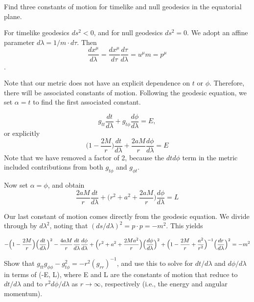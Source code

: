 \documentclass[11pt,largemargins]{homework}
\begin{document}
\begin{alphaparts}
\questionpart
Find three constants of motion for timelike and null geodesics in the equatorial plane. 

For timelike geodesics $ds^2 < 0$, and for null geodesics $ds^2 = 0$.  We adopt an affine parameter $d\lambda = 1/m \cdot d\tau$. Then 
$$\frac{dx^{\mu}}{d\lambda} = \frac{dx^{\mu}}{d\tau} \frac{d\tau}{d\lambda} = u^{\mu}m = p^{\mu}$$.

Note that our metric does not have an explicit dependence on $t$ or $\phi$.  Therefore, there will be associated constants of motion.  Following the geodesic equation, we set $\alpha = t$ to find the first associated constant. 

$$g_{tt} \frac{dt}{d\lambda} + g_{t\phi} \frac{d\phi}{d\lambda} = E,$$ or explicitly
$$\Big(1 - \frac{2M}{r} \Big) \frac{dt}{d\lambda} +  \frac{2aM}{r} \frac{d\phi}{d\lambda} = E$$
Note that we have removed a factor of 2, because the $dtd\phi$ term in the metric included contributions from both $g_{t\phi}$ and $g_{\phi t}$.

Now set $\alpha = \phi$, and obtain
$$\frac{2aM}{r} \frac{dt}{d\lambda} + \Big(r^2 + a^2 + \frac{2aM}{r} \Big) \frac{d\phi}{d\lambda} = L $$

Our last constant of motion comes directly from the geodesic equation.  We divide through by $d\lambda^2$, noting that $(ds/d\lambda)^2 = p \cdot p = -m^2.$  This yields

$$
\centering
- \Big(1 - \frac{2M}{r} \Big) \Big(\frac{dt}{d\lambda}\Big)^2 - \frac{4aM}{r} \frac{dt}{d\lambda} \frac{d\phi}{d\lambda} + \Big(r^2 + a^2 + \frac{2Ma^2}{r} \Big) \Big( \frac{d\phi}{d\lambda} \Big)^2 +  \Big(1 - \frac{2M}{r} + \frac{a^2}{r^2} \Big)^{-1} \Big(\frac{dr}{d\lambda} \Big)^2 = -m^2 $$

\questionpart
Show that $g_{tt} g_{\phi \phi} - g_{t \phi}^2 = -r^2 (g_{rr})^{-1}$, and use this to solve for $dt/d\lambda$ and $d\phi / d\lambda$ in terms of (-E, L), where E and L are the constants of motion that reduce to $dt/d\lambda$ and to $r^2 d\phi / d\lambda$ as $r \to \infty$, respectively (i.e., the energy and angular momentum).


\end{alphaparts}
\end{document}
